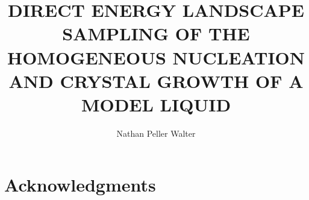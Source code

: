 \documentclass[edeposit,fullpage, centerchapter]{uiucthesis2009}
\begin{document}
\title{DIRECT ENERGY LANDSCAPE SAMPLING OF THE HOMOGENEOUS NUCLEATION AND CRYSTAL GROWTH OF A MODEL LIQUID}
\author{Nathan Peller Walter}

\msthesis
{}

\maketitle

\frontmatter

\begin{abstract}

\end{abstract}

\begin{dedication}

\end{dedication}

\chapter*{Acknowledgments}



\tableofcontents
\listoftables
\listoffigures

\end{document}

